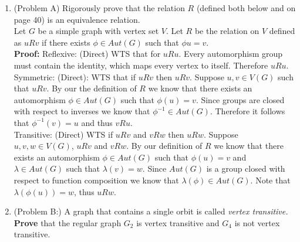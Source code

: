 \documentclass{amsart}
\newcommand{\vertex}{\node[vertex]}
\begin{document}
\thispagestyle{fancy}
 
\begin{enumerate}
\item (Problem A) Rigorously prove that the relation $R$ (defined both below and on page 40) is an equivalence relation.  \\

Let $G$ be a simple graph with vertex set $V.$ Let $R$ be the relation on $V$ defined as $uRv$ if there exists $\phi \in Aut(G)$ such that $\phi u =v.$ \\

\textbf{Proof:}
Reflexive: (Direct) WTS that for $uRu$. Every automorphism group must contain the identity, which maps every vertex to itself. Therefore $uRu$.\\

Symmetric: (Direct): WTS that if $uRv$ then $uRv$. Suppose $u,v \in V(G)$ such that  $uRv$. By our the definition of $R$ we know that there exists an automorphism $\phi \in Aut(G)$ such that $\phi(u) = v$. Since groups are closed with respect to inverses we know that $\phi^{-1} \in Aut(G)$. Therefore it follows that $\phi^{-1}(v) = u$ and thus $vRu$.\\

Transitive: (Direct) WTS if $uRv$ and $vRw$ then $uRw$. Suppose $u,v,w \in V(G)$, $uRv$ and $vRw$. By our definition of $R$ we know that there exists an automorphism $\phi \in Aut(G)$ such that $\phi(u) = v$ and $\lambda \in Aut(G)$ such that $\lambda(v) = w$. Since $Aut(G)$ is a group closed with respect to function composition we know that $\lambda(\phi) \in Aut(G)$. Note that  $\lambda(\phi(u)) = w$, thus $uRw$.\\

\vspace{1.5in}

\item (Problem B:) A graph that contains a single orbit is called \emph{vertex transitive.} \textbf{Prove} that the regular graph $G_2$ is vertex transitive and $G_4$ is not vertex transitive. \\

\begin{center}
\hspace{1.5in}
\end{center}


\end{enumerate}
\end{document}
